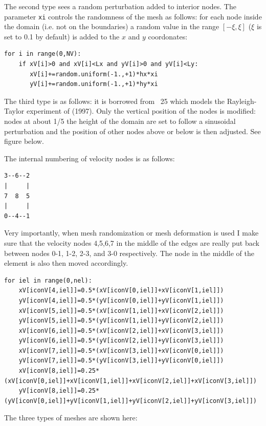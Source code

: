 The second type sees a random perturbation added to interior nodes.
The parameter \lstinline{xi} controls the randomness of the mesh as follows:
for each node inside the domain (i.e. not on the boundaries) a random value 
in the range $[-\xi,\xi]$ ($\xi$ is set to 0.1 by default) 
is added to the $x$ and $y$ coordonates:
\begin{lstlisting}
for i in range(0,NV):
    if xV[i]>0 and xV[i]<Lx and yV[i]>0 and yV[i]<Ly:
       xV[i]+=random.uniform(-1.,+1)*hx*xi
       yV[i]+=random.uniform(-1.,+1)*hy*xi
\end{lstlisting}

The third type is as follows: it is borrowed from \stone~25 which models the 
Rayleigh-Taylor experiment of \textcite{vaks97} (1997). Only the vertical position 
of the nodes is modified: nodes at about 1/5 the height of the domain are set to 
follow a sinusoidal perturbation and the position of other nodes above or below
is then adjusted. See figure below. 

The internal numbering of velocity nodes is as follows:
\begin{verbatim}
3--6--2
|     |
7  8  5
|     |
0--4--1
\end{verbatim}

Very importantly, when mesh randomization or mesh deformation is used 
I make sure that the velocity nodes 4,5,6,7 in the middle of the edges 
are really put back between nodes 0-1, 1-2, 2-3, and 3-0 respectively. 
The node in the middle of the element is also then moved accordingly.
\begin{lstlisting}
for iel in range(0,nel):
    xV[iconV[4,iel]]=0.5*(xV[iconV[0,iel]]+xV[iconV[1,iel]])
    yV[iconV[4,iel]]=0.5*(yV[iconV[0,iel]]+yV[iconV[1,iel]])
    xV[iconV[5,iel]]=0.5*(xV[iconV[1,iel]]+xV[iconV[2,iel]])
    yV[iconV[5,iel]]=0.5*(yV[iconV[1,iel]]+yV[iconV[2,iel]])
    xV[iconV[6,iel]]=0.5*(xV[iconV[2,iel]]+xV[iconV[3,iel]])
    yV[iconV[6,iel]]=0.5*(yV[iconV[2,iel]]+yV[iconV[3,iel]])
    xV[iconV[7,iel]]=0.5*(xV[iconV[3,iel]]+xV[iconV[0,iel]])
    yV[iconV[7,iel]]=0.5*(yV[iconV[3,iel]]+yV[iconV[0,iel]])
    xV[iconV[8,iel]]=0.25*(xV[iconV[0,iel]]+xV[iconV[1,iel]]+xV[iconV[2,iel]]+xV[iconV[3,iel]])
    yV[iconV[8,iel]]=0.25*(yV[iconV[0,iel]]+yV[iconV[1,iel]]+yV[iconV[2,iel]]+yV[iconV[3,iel]])
\end{lstlisting}

The three types of meshes are shown here:

